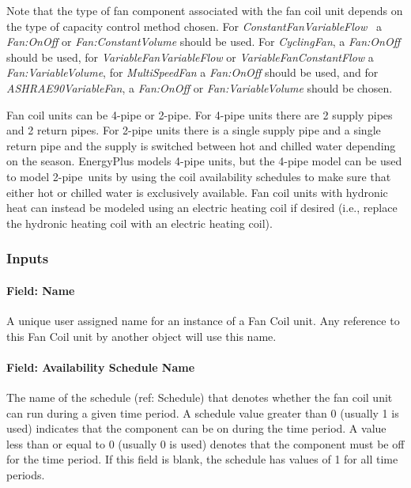 Note that the type of fan component associated with the fan coil unit depends on the type of capacity control method chosen. For \emph{ConstantFanVariableFlow~} a \emph{Fan:OnOff} or \emph{Fan:ConstantVolume} should be used. For \emph{CyclingFan}, a \emph{Fan:OnOff} should be used, for \emph{VariableFanVariableFlow} or \emph{VariableFanConstantFlow} a \emph{Fan:VariableVolume}, for \emph{MultiSpeedFan} a \emph{Fan:OnOff} should be used, and for \emph{ASHRAE90VariableFan}, a \emph{Fan:OnOff} or \emph{Fan:VariableVolume} should be chosen.

Fan coil units can be 4-pipe or 2-pipe. For 4-pipe units there are 2 supply pipes and 2 return pipes. For 2-pipe units there is a single supply pipe and a single return pipe and the supply is switched between hot and chilled water depending on the season. EnergyPlus models 4-pipe units, but the 4-pipe model can be used to model 2-pipe~units by using the coil availability schedules to make sure that either hot or chilled water is exclusively available. Fan coil units with hydronic heat can instead be modeled using an electric heating coil if desired (i.e., replace the hydronic heating coil with an electric heating coil).

\subsubsection{Inputs}\label{inputs-1-053}

\paragraph{Field: Name}\label{field-name-1-051}

A unique user assigned name for an instance of a Fan Coil unit. Any reference to this Fan Coil unit by another object will use this name.

\paragraph{Field: Availability Schedule Name}\label{field-availability-schedule-name-1-015}

The name of the schedule (ref: Schedule) that denotes whether the fan coil unit can run during a given time period. A schedule value greater than 0 (usually 1 is used) indicates that the component can be on during the time period. A value less than or equal to 0 (usually 0 is used) denotes that the component must be off for the time period. If this field is blank, the schedule has values of 1 for all time periods.

